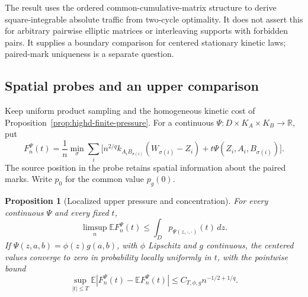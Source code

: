 \documentclass[11pt,reqno]{amsart}
\newtheorem{proposition}[theorem]{Proposition}
\theoremstyle{definition}
\theoremstyle{remark}
\numberwithin{equation}{section}
\newcommand{\R}{\mathbb R}
\newcommand{\E}{\mathbb E}
\begin{document}
The result uses the ordered common-cumulative-matrix structure to
derive square-integrable absolute traffic from two-cycle optimality.
It does not assert this for arbitrary pairwise elliptic matrices or
interleaving supports with forbidden pairs. It supplies a boundary
comparison for centered stationary kinetic laws; paired-mark uniqueness
is a separate question.

\subsection{Spatial probes and an upper comparison}
\label{subsec:highd-localized-pressure}

Keep uniform product sampling and the homogeneous kinetic cost of
Proposition~\ref{prop:highd-finite-pressure}. For a continuous
\(\Psi:D\times K_A\times K_B\to\R\), put
\[
F_n^\Psi(t)=\frac1n\min_\sigma\sum_i
 \bigl[n^{2/q}k_{A_iB_{\sigma(i)}}(W_{\sigma(i)}-Z_i)
       +t\Psi(Z_i,A_i,B_{\sigma(i)})\bigr].
\]
The source position in the probe retains spatial information about
the paired marks. Write \(p_0\) for the common value \(p_g(0)\).

\begin{proposition}[Localized upper pressure and concentration]
\label{prop:highd-localized-upper}
For every continuous \(\Psi\) and every fixed \(t\),
\begin{equation}
\limsup_n\E F_n^\Psi(t)
 \le\int_D p_{\Psi(z,\cdot,\cdot)}(t)\,dz.
\label{eq:highd-localized-upper}
\end{equation}
If \(\Psi(z,a,b)=\phi(z)g(a,b)\), with \(\phi\) Lipschitz
and \(g\) continuous, the centered values converge to zero in
probability locally uniformly in \(t\), with the pointwise bound
\[
\sup_{|t|\le T}\E|F_n^\Psi(t)-\E F_n^\Psi(t)|
 \le C_{T,\phi,g}n^{-1/2+1/q}.
\]
\end{proposition}
\end{document}
